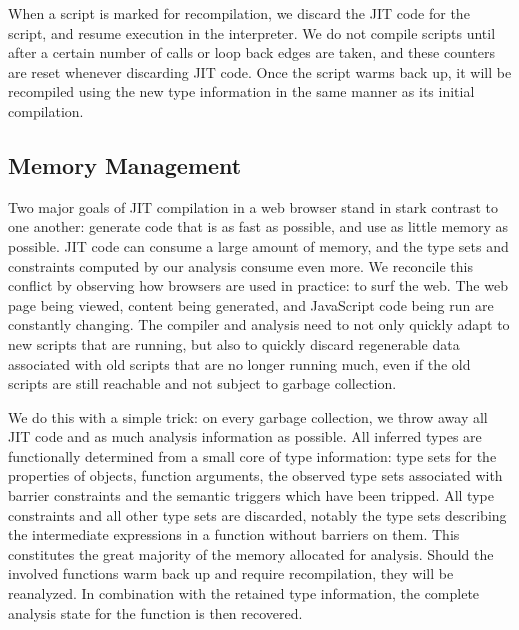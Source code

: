 When a script is marked for recompilation, we
discard the JIT code for the script, and resume execution in the
interpreter.
We do not compile scripts until after a certain number of calls or loop back
edges are taken, and these counters are reset whenever discarding JIT code.
Once the script warms back up, it will be recompiled using the new type information
in the same manner as its initial compilation.

\subsection{Memory Management}
\label{sec:memory}

Two major goals of JIT compilation in a web browser stand in stark contrast
to one another: generate code that is as fast as possible, and use as little
memory as possible.
JIT code can consume a large amount of memory, and the type sets and constraints
computed by our analysis consume even more.
We reconcile this conflict by observing how browsers are used in practice:
to surf the web.
The web page being viewed, content being generated, and JavaScript code being
run are constantly changing.
The compiler and analysis need to not only quickly adapt to new scripts that are
running, but also to quickly discard regenerable data associated with
old scripts that are no longer running much, even if the old scripts are still
reachable and not subject to garbage collection.

We do this with a simple trick:
on every garbage collection, we throw away all JIT code and as much analysis
information as possible.
All inferred types are functionally determined from a small core of type
information:
type sets for the properties of objects, function arguments, the observed
type sets associated with barrier constraints and the semantic triggers which
have been tripped.
All type constraints and all other type sets are discarded, notably the type sets
describing the intermediate expressions in a function without barriers on them.
This constitutes the great majority of the memory allocated for analysis.
Should the involved functions warm back up and require recompilation,
they will be reanalyzed. In combination with the retained type information,
the complete analysis state for the function is then recovered.

